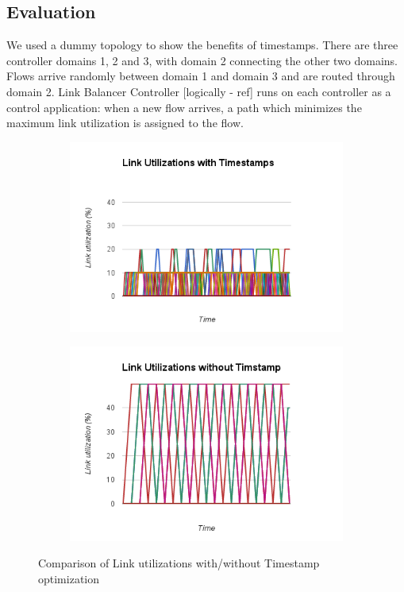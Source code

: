 \documentclass[10pt, twocolumn]{article}
\begin{document}
\subsection{Evaluation}
We used a dummy topology to show the benefits of timestamps. There are three controller domains 1, 2 and 3, with domain 2 connecting the other two domains. Flows arrive randomly between domain 1 and domain 3 and are routed through domain 2. Link Balancer Controller [logically - ref] runs on each controller as a control application: when a new flow arrives, a path which minimizes the maximum link utilization is assigned to the flow.

\begin{figure}

\begin{subfigure}{.5\textwidth}
 \includegraphics[scale=0.4]{chart_1}
\end{subfigure}
\begin{subfigure}{.5\textwidth}
 \includegraphics[scale=0.4]{chart_2}
\end{subfigure}
\caption{Comparison of Link utilizations with/without Timestamp optimization}
\label{fig:timestamp}
\end{figure}
\end{document}
